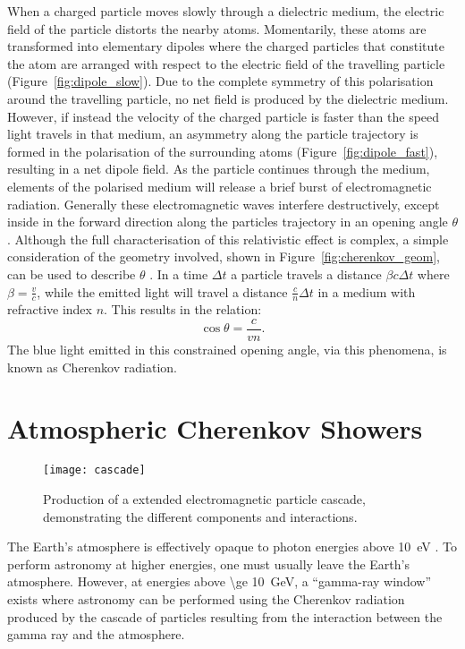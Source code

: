 When a charged particle moves slowly through a dielectric medium, the electric field of the particle distorts the nearby atoms. Momentarily, these atoms are transformed into elementary dipoles where the charged particles that constitute the atom are arranged with respect to the electric field of the travelling particle (Figure~\ref{fig:dipole_slow}). Due to the complete symmetry of this polarisation around the travelling particle, no net field is produced by the dielectric medium. However, if instead the velocity of the charged particle is faster than the speed light travels in that medium, an asymmetry along the particle trajectory is formed in the polarisation of the surrounding atoms (Figure~\ref{fig:dipole_fast}), resulting in a net dipole field. As the particle continues through the medium, elements of the polarised medium will release a brief burst of electromagnetic radiation. Generally these electromagnetic waves interfere destructively, except inside in the forward direction along the particles trajectory in an opening angle $\theta$. Although the full characterisation of this relativistic effect is complex, a simple consideration of the geometry involved, shown in Figure~\ref{fig:cherenkov_geom}, can be used to describe $\theta$ \cite{Jelley1958a}. In a time $\Delta t$ a particle travels a distance $\beta c \Delta t$ where $\beta = \frac{v}{c}$, while the emitted light will travel a distance $\frac{c}{n} \Delta t$ in a medium with refractive index $n$. This results in the relation:
\begin{equation} \label{eq:cherenkov_angle}
\cos \theta = \frac{c}{vn}.
\end{equation}
The blue light emitted in this constrained opening angle, via this phenomena, is known as Cherenkov radiation.

\section{Atmospheric Cherenkov Showers} \label{section:cherenkov_shower_intro}

\begin{figure}
	\centering\texttt{[image: cascade]} 
	\caption[Production of a extended electromagnetic particle cascade.]{Production of a extended electromagnetic particle cascade, demonstrating the different components and interactions.}
	\label{fig:cascade}
\end{figure}

The Earth's atmosphere is effectively opaque to photon energies above \SI{10}{eV} \cite{Weekes2003}. To perform astronomy at higher energies, one must usually leave the Earth's atmosphere. However, at energies above \SI{\ge 10}{GeV}, a ``gamma-ray window'' exists where astronomy can be performed using the Cherenkov radiation produced by the cascade of particles resulting from the interaction between the gamma ray and the atmosphere.

